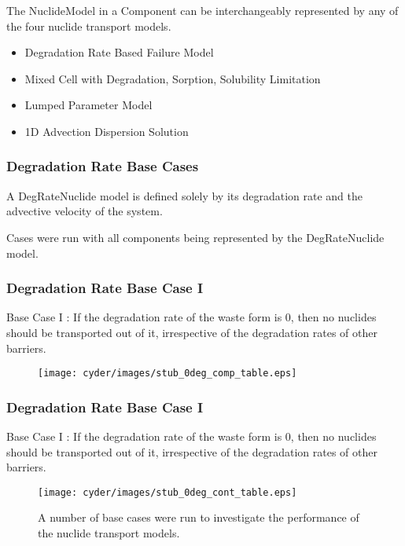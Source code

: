 \begin{frame}
  The NuclideModel in a Component can be interchangeably represented by any of 
  the four nuclide transport models. 
    \begin{itemize}
      \item Degradation Rate Based Failure Model
      \item Mixed Cell with Degradation, Sorption, Solubility Limitation
      \item Lumped Parameter Model
      \item 1D Advection Dispersion Solution
    \end{itemize}
\end{frame}

\begin{frame}
  \frametitle{Degradation Rate Base Cases}
  A DegRateNuclide model is defined solely by its degradation rate and the 
  advective velocity of the system. 

  Cases were run with all components being represented by the DegRateNuclide 
  model.  
\end{frame}


\begin{frame}
  \frametitle{Degradation Rate Base Case I}
  Base Case I : If the degradation rate of the waste form is 0, then no nuclides should be 
  transported out of it, irrespective of the degradation rates of other 
  barriers. 

  \begin{figure}[htbp!]
    \begin{center}
      \texttt{[image: cyder/images/stub\_0deg\_comp\_table.eps]}
    \end{center}
  \end{figure}
\end{frame}

\begin{frame}
  \frametitle{Degradation Rate Base Case I}
  Base Case I : If the degradation rate of the waste form is 0, then no nuclides should be 
  transported out of it, irrespective of the degradation rates of other 
  barriers. 

  \begin{figure}[htbp!]
    \begin{center}
      \texttt{[image: cyder/images/stub\_0deg\_cont\_table.eps]}
      \caption{A number of base cases were run to investigate the performance of 
      the nuclide transport models.}
    \end{center}
  \end{figure}
\end{frame}

